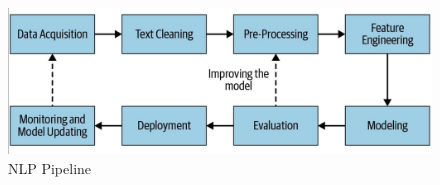 \begin{figure}
  \center
  \includegraphics[width=.8\textwidth]{res/pipeline.png}
  \caption{NLP Pipeline}\label{fig:pipeline}
\end{figure}